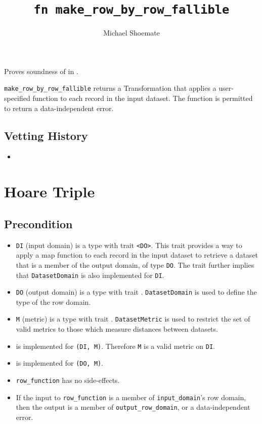 \documentclass{article}
\title{\texttt{fn make\_row\_by\_row\_fallible}}
\author{Michael Shoemate}
\date{}
\begin{document}
\maketitle

\contrib
Proves soundness of  in .

\texttt{make\_row\_by\_row\_fallible} returns a Transformation that applies a user-specified function to each record in the input dataset.
The function is permitted to return a data-independent error.

\subsection*{Vetting History}
\begin{itemize}
    \item {}
\end{itemize}

\section{Hoare Triple}
\subsection*{Precondition}
\begin{itemize}

    \item \texttt{DI} (input domain) is a type with trait \texttt{<DO>}.
        This trait provides a way to apply a map function to each record in the input dataset to retrieve a dataset that is a member of the output domain, of type \texttt{DO}. The trait further implies that \texttt{DatasetDomain} is also implemented for \texttt{DI}.
    \item \texttt{DO} (output domain) is a type with trait .
        \texttt{DatasetDomain} is used to define the type of the row domain.
    \item \texttt{M} (metric) is a type with trait .
        \texttt{DatasetMetric} is used to restrict the set of valid metrics to those which measure distances between datasets.
    \item {} is implemented for \texttt{(DI, M)}. Therefore \texttt{M} is a valid metric on \texttt{DI}.
    \item {} is implemented for \texttt{(DO, M)}.
    \item \texttt{row\_function} has no side-effects.
    \item If the input to \texttt{row\_function} is a member of \texttt{input\_domain}'s row domain, then the output is a member of \texttt{output\_row\_domain}, or a data-independent error.
\end{itemize}
\end{document}
